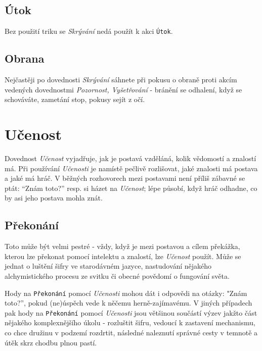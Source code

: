 \documentclass[../main.tex]{subfiles}
\begin{document}
\subsection*{Útok}
\label{subsec:skryvani-utok}
\utok

Bez použití triku se \textit{Skrývání} nedá použít k akci \texttt{Útok}.

\subsection*{Obrana}
\label{subsec:skryvani-obrana}


Nejčastěji po dovednosti \textit{Skrývání} sáhnete při pokusu o obraně proti akcím vedených dovednostmi \textit{Pozornost, Vyšetřování} - bránění se odhalení, když se schováváte, zametání stop, pokusy sejít z očí.

\section{Učenost}
\label{sec:ucenost}

Dovednost \textit{Učenost} vyjadřuje, jak je postavá vzděláná, kolik vědomostí a znalostí má. Při používání \textit{Učenosti} je namístě pečlivě rozlišovat, jaké znalosti má postava a jaké má hráč. V běžných rozhovorech mezi postavami není příliš zábavné se ptát: ``Znám toto?'' resp. si házet na \textit{Učenost}; lépe působí, když hráč odhadne, co by asi jeho postava mohla znát.

\subsection*{Překonání}
\label{subsec:ucenost-prekonani}
\prekonani

Toto může být velmi pestré - vždy, když je mezi postavou a cílem překážka, kterou lze překonat pomocí intelektu a znalostí, lze \textit{Učenost} použít. Může se jednat o luštění šifry ve starodávném jazyce, nastudování nějakého alchymistického procesu ze svitku či obecné povědomí o fungování světa.

Hody na \texttt{Překonání} pomocí \textit{Učenosti} mohou dát i odpovědi na otázky: "Znám toto?'', pokud (ne)úspěch vede k něčemu herně-zajímavému. V jiných případech pak hody na \texttt{Překonání} pomocí \textit{Učenosti} jsou většinou součástí výzev jakžto část nějakého komplexnějšího úkolu - rozluštit šifru, vedoucí k zastavení mechanismu, co chce družinu v podzemí rozdrtit, následné naleznutí správné cesty v temnotě a útěk skrz chodbu plnou pastí.
\end{document}
